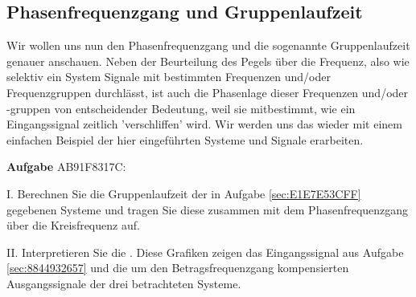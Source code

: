 \subsection{Phasenfrequenzgang und Gruppenlaufzeit}
\label{sec:AB91F8317C}
\begin{Ziel}
Wir wollen uns nun den Phasenfrequenzgang und die sogenannte Gruppenlaufzeit
genauer anschauen. Neben der Beurteilung des Pegels über die Frequenz,
also wie selektiv ein System Signale mit bestimmten Frequenzen und/oder
Frequenzgruppen durchlässt, ist auch die Phasenlage dieser Frequenzen und/oder
-gruppen von entscheidender Bedeutung, weil sie mitbestimmt, wie ein Eingangssignal
zeitlich 'verschliffen' wird.
Wir werden uns das wieder mit einem einfachen Beispiel der hier eingeführten
Systeme und Signale erarbeiten.
\end{Ziel}
\textbf{Aufgabe} {\tiny AB91F8317C}:

\noindent I. Berechnen Sie die Gruppenlaufzeit
der in Aufgabe \ref{sec:E1E7E53CFF} gegebenen Systeme und
tragen Sie diese zusammen mit dem Phasenfrequenzgang über die Kreisfrequenz auf.

\noindent II. Interpretieren Sie die . Diese Grafiken
zeigen das Eingangssignal aus Aufgabe \ref{sec:8844932657} und die um den
Betragsfrequenzgang kompensierten Ausgangssignale der drei betrachteten
Systeme.


